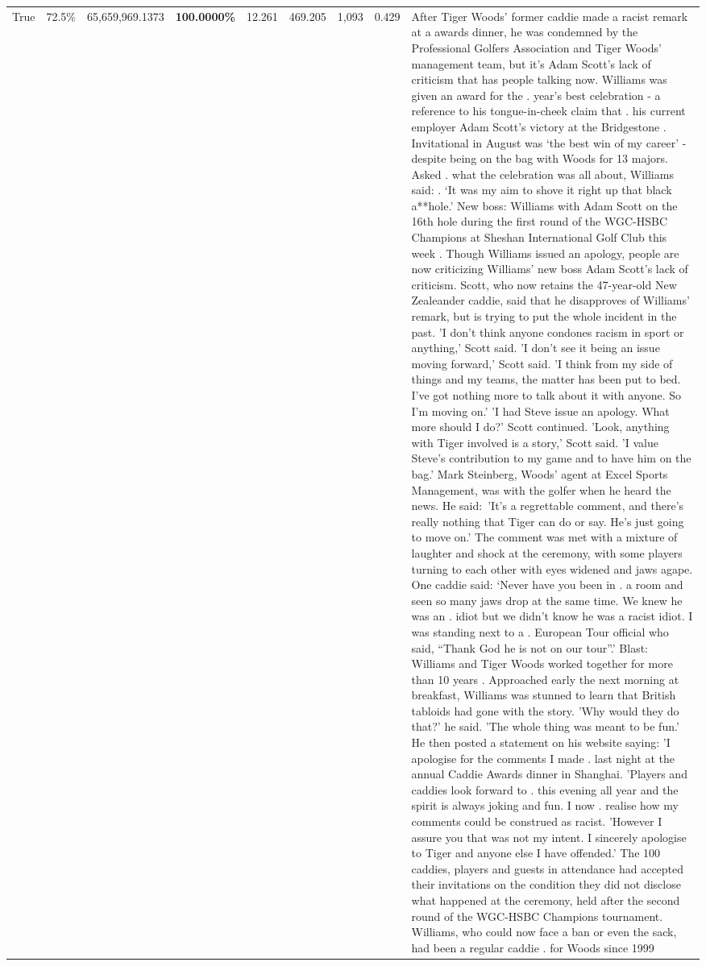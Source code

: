 \begin{table}[H]
\begin{tabular}{lllrlllll}
True & 72.5\% & 65,659,969.1373 & \bfseries \color{red} 100.0000\% & 12.261 & 469.205 & 1,093 & 0.429 & After Tiger Woods' former caddie made a racist remark at a awards dinner, he was condemned by the Professional Golfers Association and Tiger Woods' management team, but it's Adam Scott's lack of criticism that has people talking now. Williams was given an award for the . year’s best celebration - a reference to his tongue-in-cheek claim that . his current employer Adam Scott’s victory at the Bridgestone . Invitational in August was ‘the best win of my career’ - despite being on the bag with Woods for 13 majors. Asked . what the celebration was all about, Williams said: . ‘It was my aim to shove it right up that black a**hole.’ New boss: Williams with Adam Scott  on the 16th hole during the first round of the WGC-HSBC Champions at Sheshan International Golf Club this week . Though Williams issued an apology, people are now criticizing Williams' new boss Adam Scott's lack of criticism. Scott, who now retains the 47-year-old New Zealeander caddie, said that he disapproves of Williams' remark, but is trying to put the whole incident in the past. 'I don't think anyone condones racism in sport or anything,' Scott said. 'I don't see it being an issue moving forward,' Scott said. 'I think from my side of things and my teams, the matter has been put to bed. I've got nothing more to talk about it with anyone. So I'm moving on.' 'I had Steve issue an apology. What more should I do?' Scott continued. 'Look, anything with Tiger involved is a story,' Scott said. 'I value Steve's contribution to my game and to have him on the bag.' Mark Steinberg, Woods' agent at Excel Sports Management, was with the golfer when he heard the news. He said: 'It's a regrettable comment, and there's really nothing that Tiger can do or say. He's just going to move on.' The comment was met with a mixture of laughter and shock at the ceremony, with some players turning to each other with eyes widened and jaws agape. One caddie said: ‘Never have you been in . a room and seen so many jaws drop at the same time. We knew he was an . idiot but we didn’t know he was a racist idiot. I was standing next to a . European Tour official who said, “Thank God he is not on our tour”.’ Blast: Williams and Tiger Woods worked together for more than 10 years . Approached early the next morning at breakfast, Williams was stunned to learn that British tabloids had gone with the story. 'Why would they do that?' he said. 'The whole thing was meant to be fun.' He then posted a statement on his website saying: 'I apologise for the comments I made . last night at the annual Caddie Awards dinner in Shanghai. 'Players and caddies look forward to . this evening all year and the spirit is always joking and fun. I now . realise how my comments could be construed as racist. 'However I assure you that was not my intent. I sincerely apologise to Tiger and anyone else I have offended.' The 100 caddies, players and guests in attendance had accepted their invitations on the condition they did not disclose what happened at the ceremony, held after the second round of the WGC-HSBC Champions tournament. Williams, who could now face a ban or even the sack, had been a regular caddie . for Woods since 1999 
\end{tabular}
\end{table}
